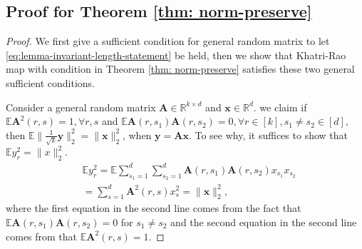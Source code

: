 \subsection*{Proof for Theorem \ref{thm: norm-preserve}}
\begin{proof}

We first give a sufficient condition for general random matrix to let  \eqref{eq:lemma-invariant-length-statement} be held, then we show that Khatri-Rao map with condition in Theorem \ref{thm: norm-preserve} satisfies these two general sufficient conditions. \par 



Consider a general random matrix $\mathbf{A}\in \mathbb{R}^{k \times d}$ and $\mathbf{x} \in \mathbb{R}^d$.
we claim if ~$\mathbb{E}{\mathbf{A}^2(r,s)}=1, \forall r,s $ and $\mathbb{E}{\mathbf{A}(r,s_1)\mathbf{A}(r,s_2)} = 0, \forall r \in[k], s_1\neq s_2 \in[d]$,
then $\mathbb{E}\| \frac{1}{\sqrt{k}}\mathbf{y}\|_2^2 = \|\mathbf{x}\|_2^2$, when $\mathbf{y}=\mathbf{A}\mathbf{x}$. To see why, it suffices to show that $\mathbb{E} y_r^2 = \|x\|^2_2$.
\begin{equation} \label{eq:row-length}
\begin{aligned}
&\mathbb{E}{y_r^2} = \mathbb{E}{\sum_{s_1=1}^d\sum_{s_2=1}^d \mathbf{A}(r,s_1)\mathbf{A}(r,s_2)x_{s_1}x_{s_2}} \\
&= \sum_{s=1}^d \mathbf{A}^2(r,s)x_s^2 = \|\mathbf{x}\|^2_2,  \nonumber
\end{aligned}
\end{equation}
where the first equation in the second line comes from the fact that $\mathbb{E} {\mathbf{A}(r,s_1)\mathbf{A}(r,s_2)}  = 0$ for $s_1\neq s_2$ and the second equation in the second line comes from that $\mathbb{E}{\mathbf{A}^2(r,s)} =1$.


\end{proof}

